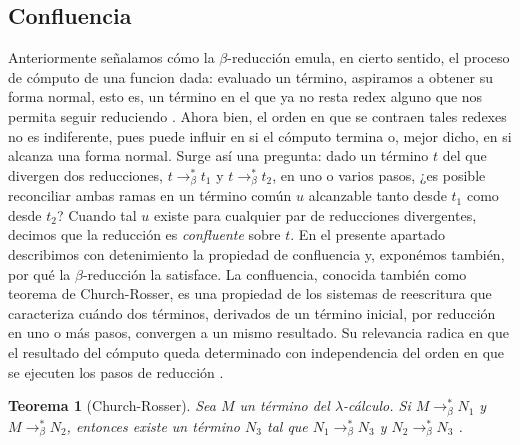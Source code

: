 \documentclass[a4paper,12pt]{report}
\theoremstyle{definition}
\theoremstyle{plain}
\newtheorem{theorem}{Teorema}[chapter]
\theoremstyle{remark}
\begin{document}
\subsection{Confluencia}
Anteriormente señalamos cómo la $\beta$-reducción emula, en cierto sentido, el proceso de cómputo de una funcion dada: evaluado un término, aspiramos a obtener su forma normal, esto es, un término en el que ya no resta redex alguno que nos permita seguir reduciendo \citep{barendregt1984, pierce2002}.
\newline
\newline
Ahora bien, el orden en que se contraen tales redexes no es indiferente, pues puede influir en si el cómputo termina o, mejor dicho, en si alcanza una forma normal. Surge así una pregunta: dado un término $t$ del que divergen dos reducciones, $t \to_\beta^{\ast} t_1$ y $t \to_\beta^{\ast} t_2$, en uno o varios pasos, ¿es posible reconciliar ambas ramas en un término común $u$ alcanzable tanto desde $t_1$ como desde $t_2$? Cuando tal $u$ existe para cualquier par de reducciones divergentes, decimos que la reducción es \textit{confluente} sobre $t$.
\newline
\newline
En el presente apartado describimos con detenimiento la propiedad de confluencia y, exponémos también, por qué la $\beta$-reducción la satisface.
\newline
\newline
La confluencia, conocida también como teorema de Church-Rosser, es una propiedad de los sistemas de reescritura que caracteriza cuándo dos términos, derivados de un término inicial, por reducción en uno o más pasos, convergen a un mismo resultado. Su relevancia radica en que el resultado del cómputo queda determinado con independencia del orden en que se ejecuten los pasos de reducción \citep{barendregt1984}.

\begin{theorem}[Church-Rosser]
  Sea $M$ un término del $\lambda$-cálculo. Si $M\to_\beta^{\ast}N_1$ y $M\to_\beta^{\ast}N_2$, entonces existe un término $N_3$ tal que $N_1\to_\beta^{\ast}N_3$ y $N_2\to_\beta^{\ast}N_3$ \citep[p.~62]{barendregt1984}.
\end{theorem}
\medskip
\end{document}
